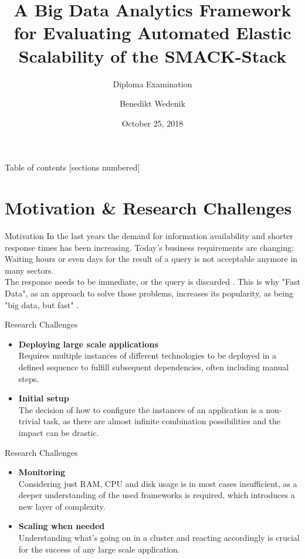\documentclass[10pt]{beamer}
\title{A Big Data Analytics Framework for Evaluating Automated Elastic Scalability of the SMACK-Stack}
\subtitle{Diploma Examination}
\date{October 25, 2018}
\author{Benedikt Wedenik}
\begin{document}
\maketitle

\begin{frame}{Table of contents}
  [sections numbered]
  \tableofcontents[hideallsubsections]
\end{frame}

\section{Motivation \& Research Challenges}

\begin{frame}{Motivation}
	In the last years the demand for information availability and shorter response times has been increasing.
	Today's business requirements are changing: Waiting hours or even days for the result of a query is not acceptable anymore in many sectors.\\

	The response needs to be immediate, or the query is discarded \cite{estrada2016big}.
	This is why "Fast Data", as an approach to solve those problems, increases its popularity, as being "big data, but fast" \cite{mishne2013fast}.\\
\end{frame}

\begin{frame}{Research Challenges}
	\begin{itemize}
	\item \textbf{Deploying large scale applications} \\
		Requires multiple instances of different technologies to be deployed in a defined sequence to fulfill subsequent dependencies, often including manual steps.
	\item \textbf{Initial setup} \\
		The decision of how to configure the instances of an application is a non-trivial task, as there are almost infinite combination possibilities and the impact can be drastic.
	\end{itemize}
\end{frame}

\begin{frame}{Research Challenges}
	\begin{itemize}
	\item \textbf{Monitoring} \\
		Considering just RAM, CPU and disk usage is in most cases insufficient, as a deeper understanding of the used frameworks is required, which introduces a new layer of complexity.
	\item \textbf{Scaling when needed} \\
		Understanding what’s going on in a cluster and reacting accordingly is crucial for the success of any large scale application.
	\end{itemize}
\end{frame}
\end{document}
